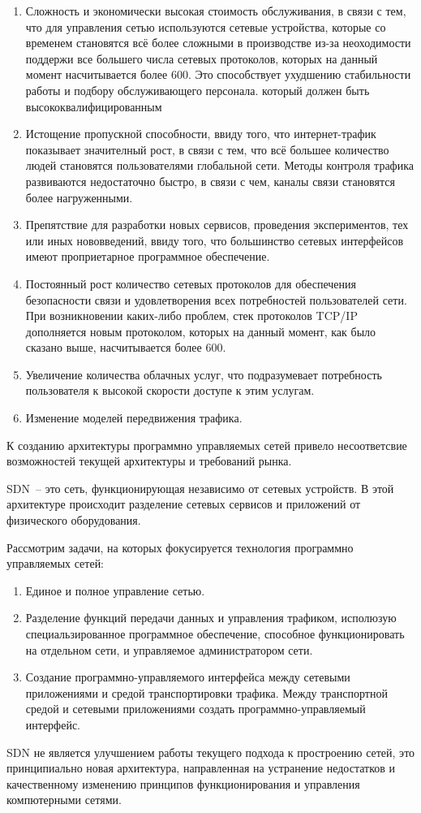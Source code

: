 \documentclass[bachelor, och, coursework]{SCWorks}
\begin{document}
\begin{enumerate}
    \item Сложность и экономически высокая стоимость обслуживания, в связи с тем, что для управления сетью используются сетевые устройства, которые со временем становятся всё более сложными в производстве из-за неоходимости поддержи все большего числа сетевых протоколов, которых на данный момент насчитывается более 600. Это способствует ухудшению стабильности работы и подбору обслуживающего персонала. который должен быть высококвалифицированным
    \item Истощение пропускной способности, ввиду того, что интернет-трафик показывает значителный рост, в связи с тем, что всё большее количество людей становятся пользователями глобальной сети. Методы контроля трафика развиваются недостаточно быстро, в связи с чем, каналы связи становятся более нагруженными.
    \item Препятствие для разработки новых сервисов, проведения экспериментов, тех или иных нововведений, ввиду того, что большинство сетевых интерфейсов имеют проприетарное программное обеспечение.
    \item Постоянный рост количество сетевых протоколов для обеспечения безопасности связи и удовлетворения всех потребностей пользователей сети. При возникновении каких-либо проблем, стек протоколов TCP/IP дополняется новым протоколом, которых на данный момент, как было сказано выше, насчитывается более 600.
    \item Увеличение количества облачных услуг, что подразумевает потребность пользователя к высокой скорости доступе к этим услугам.
    \item Изменение моделей передвижения трафика.
\end{enumerate}
К созданию архитектуры программно управляемых сетей привело несоответсвие возможностей текущей архитектуры и требований рынка.

SDN~-- это сеть, функционирующая независимо от сетевых устройств. В этой архитектуре происходит разделение сетевых сервисов и приложений от физического оборудования.

Рассмотрим задачи, на которых фокусируется технология программно управляемых сетей:
\begin{enumerate}
    \item Единое и полное управление сетью.
    \item Разделение функций передачи данных и управления трафиком, исполюзую специальзированное программное обеспечение, способное функционировать на отдельном сети, и управляемое администратором сети.
    \item Создание программно-управляемого интерфейса между сетевыми приложениями и средой транспортировки трафика. 
    Между транспортной средой и сетевыми приложениями создать программно-управляемый интерфейс.
\end{enumerate}
SDN не является улучшением работы текущего подхода к простроению сетей, это принципиально новая архитектура, направленная на устранение недостатков и качественному изменению принципов функционирования и управления компютерными сетями\cite{shalaginov}.
\end{document}
